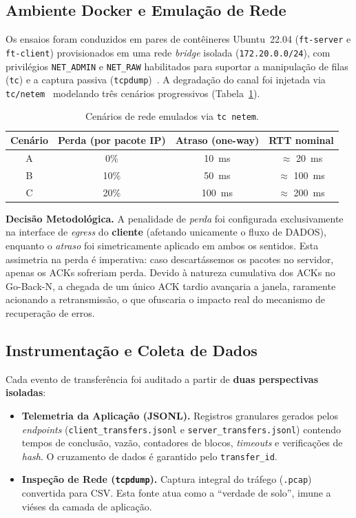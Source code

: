 \documentclass[12pt]{article}
\begin{document}
\subsection{Ambiente Docker e Emulação de Rede}

Os ensaios foram conduzidos em pares de contêineres Ubuntu~22.04 (\texttt{ft-server} e
\texttt{ft-client}) provisionados em uma rede \emph{bridge} isolada (\texttt{172.20.0.0/24}),
com privilégios \texttt{NET\_ADMIN} e \texttt{NET\_RAW} habilitados para suportar a manipulação de 
filas (\texttt{tc}) e a captura passiva (\texttt{tcpdump})~\cite{merkel2014}. A degradação do canal foi 
injetada via \texttt{tc/netem}~\cite{hemminger2005} modelando três cenários progressivos (Tabela~\ref{tab:cenarios}).

\begin{table}[ht]
\centering
\caption{Cenários de rede emulados via \texttt{tc netem}.}
\label{tab:cenarios}
\begin{tabular}{cccc}
\toprule
\textbf{Cenário} & \textbf{Perda (por pacote IP)} & \textbf{Atraso (one-way)} & \textbf{RTT nominal} \\
\midrule
A & 0\%  & 10~ms  & $\approx$ 20~ms \\
B & 10\% & 50~ms  & $\approx$ 100~ms \\
C & 20\% & 100~ms & $\approx$ 200~ms \\
\bottomrule
\end{tabular}
\end{table}

\textbf{Decisão Metodológica.} A penalidade de \emph{perda} foi configurada exclusivamente na interface 
de \emph{egress} do \textbf{cliente} (afetando unicamente o fluxo de DADOS), enquanto o \emph{atraso} foi 
simetricamente aplicado em ambos os sentidos. Esta assimetria na perda é imperativa: caso descartássemos 
os pacotes no servidor, apenas os ACKs sofreriam perda. Devido à natureza cumulativa dos ACKs no 
Go-Back-N, a chegada de um único ACK tardio avançaria a janela, raramente acionando a retransmissão, 
o que ofuscaria o impacto real do mecanismo de recuperação de erros.

\subsection{Instrumentação e Coleta de Dados}

Cada evento de transferência foi auditado a partir de \textbf{duas perspectivas isoladas}:
\begin{itemize}
  \item \textbf{Telemetria da Aplicação (JSONL).} Registros granulares gerados pelos \emph{endpoints} 
    (\texttt{client\_transfers.jsonl} e \texttt{server\_transfers.jsonl}) contendo tempos de conclusão, 
    vazão, contadores de blocos, \emph{timeouts} e verificações de \emph{hash}. O cruzamento de dados 
    é garantido pelo \texttt{transfer\_id}.
  \item \textbf{Inspeção de Rede (\texttt{tcpdump}).} Captura integral do tráfego (\texttt{.pcap}) 
    convertida para CSV. Esta fonte atua como a ``verdade de solo'', imune a viéses da camada de aplicação.
\end{itemize}
\end{document}
